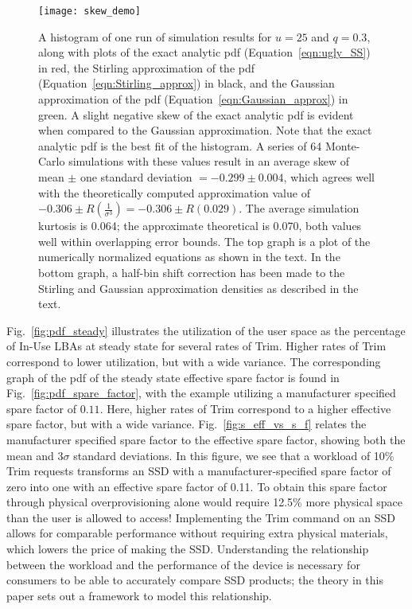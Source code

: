 \documentclass[prodmode,acmtos]{acmsmall}
\begin{document}
\begin{figure}
\centerline{\texttt{[image: skew\_demo]}}
\caption{A histogram of one run of simulation results for $u=25$ and $q=0.3$, along with plots of the exact analytic pdf (Equation~\ref{eqn:ugly_SS}) in red, the Stirling approximation of the pdf (Equation~\ref{eqn:Stirling_approx}) in black, and the Gaussian approximation of the pdf (Equation~\ref{eqn:Gaussian_approx}) in green.  A slight negative skew of the exact analytic pdf is evident when compared to the Gaussian approximation.  Note that the exact analytic pdf is the best fit of the histogram.  A series of 64 Monte-Carlo simulations with these values result in an average skew of mean $\pm$ one standard deviation $=-0.299 \pm 0.004$, which agrees well with the theoretically computed approximation value of $-0.306 \pm R\left(\frac{1}{\sigma^3}\right) = -0.306 \pm  R(0.029)$.  The average simulation kurtosis is 0.064; the approximate theoretical is 0.070, both values well within overlapping error bounds.  The top graph is a plot of the numerically normalized equations as shown in the text.  In the bottom graph, a half-bin shift correction has been made to the Stirling and Gaussian approximation densities as described in the text.}
\label{fig:skew_demo}
\end{figure}

Fig.~\ref{fig:pdf_steady} illustrates the utilization of the user space as the percentage of In-Use LBAs at steady state for several rates of Trim.  Higher rates of Trim correspond to lower utilization, but with a wide variance.  The corresponding graph of the pdf of the steady state effective spare factor is found in Fig.~\ref{fig:pdf_spare_factor}, with the example utilizing a manufacturer specified spare factor of $0.11$.  Here, higher rates of Trim correspond to a higher effective spare factor, but with a wide variance.  Fig.~\ref{fig:s_eff_vs_s_f} relates the manufacturer specified spare factor to the effective spare factor, showing both the mean and $3\sigma$ standard deviations.  In this figure, we see that a workload of 10\% Trim requests transforms an SSD with a manufacturer-specified spare factor of zero into one with an effective spare factor of 0.11.  To obtain this spare factor through physical overprovisioning alone would require 12.5\% more physical space than the user is allowed to access! Implementing the Trim command on an SSD allows for comparable performance without requiring extra physical materials, which lowers the price of making the SSD.  Understanding the relationship between the workload and the performance of the device is necessary for consumers to be able to accurately compare SSD products; the theory in this paper sets out a framework to model this relationship.
\end{document}
